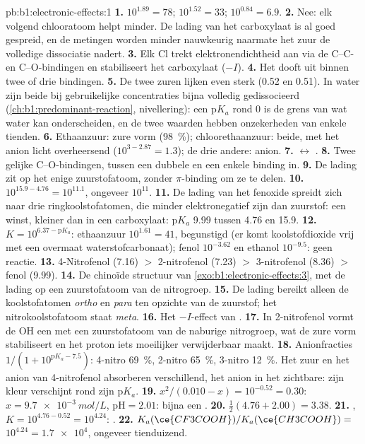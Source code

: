 \begin{solution}{pb:b1:electronic-effects:1}
\textbf{1.} $10^{1.89} = 78$; $10^{1.52} = 33$; $10^{0.84} = 6.9$.
\textbf{2.} Nee: elk volgend chlooratoom helpt minder. De lading van het
carboxylaat is al goed gespreid, en de metingen worden minder nauwkeurig
naarmate het zuur de volledige dissociatie nadert.
\textbf{3.} Elk Cl trekt elektronendichtheid aan via de C--C- en
C--O-bindingen en stabiliseert het carboxylaat ($-I$).
\textbf{4.} Het  dooft uit binnen twee of drie
bindingen.
\textbf{5.} De twee zuren lijken even sterk (0.52 en 0.51). In water zijn
beide bij gebruikelijke concentraties bijna volledig gedissocieerd
(\cref{ch:b1:predominant-reaction}, nivellering): een $\mathrm{p}K_a$ rond
0 is de grens van wat water kan onderscheiden, en de twee waarden hebben
onzekerheden van enkele tienden.
\textbf{6.} Ethaanzuur: zure vorm (\qty{98}{\percent}); chloorethaanzuur:
beide, met het anion licht overheersend ($10^{3 - 2.87} = 1.3$); de drie
andere: anion.
\textbf{7.}  $\leftrightarrow$ .
\textbf{8.} Twee gelijke C--O-bindingen, tussen een dubbele en een enkele
binding in.
\textbf{9.} De lading zit op het enige zuurstofatoom, zonder
$\pi$-binding om ze te delen.
\textbf{10.} $10^{15.9 - 4.76} = 10^{11.1}$, ongeveer $10^{11}$.
\textbf{11.} De lading van het fenoxide spreidt zich naar drie
ringkoolstofatomen, die minder elektronegatief zijn dan zuurstof: een
winst, kleiner dan in een carboxylaat: $\mathrm{p}K_a$ 9.99 tussen 4.76
en 15.9.
\textbf{12.} $K = 10^{6.37 - \mathrm{p}K_a}$: ethaanzuur $10^{1.61} = 41$,
begunstigd (er komt koolstofdioxide vrij met een overmaat
waterstofcarbonaat); fenol $10^{-3.62}$ en ethanol $10^{-9.5}$: geen
reactie.
\textbf{13.} 4-Nitrofenol (7.16) $>$ 2-nitrofenol (7.23) $>$ 3-nitrofenol
(8.36) $>$ fenol (9.99).
\textbf{14.} De chinoïde structuur van \cref{exo:b1:electronic-effects:3},
met de lading op een zuurstofatoom van de nitrogroep.
\textbf{15.} De lading bereikt alleen de koolstofatomen \textit{ortho} en
\textit{para} ten opzichte van de zuurstof; het nitrokoolstofatoom staat
\textit{meta}.
\textbf{16.} Het $-I$-effect van .
\textbf{17.} In 2-nitrofenol vormt de OH een  met een
zuurstofatoom van de naburige nitrogroep, wat de zure vorm stabiliseert
en het proton iets moeilijker verwijderbaar maakt.
\textbf{18.} Anionfracties $1/(1 + 10^{\mathrm{p}K_a - 7.5})$: 4-nitro
\qty{69}{\percent}, 2-nitro \qty{65}{\percent}, 3-nitro
\qty{12}{\percent}. Het zuur en het anion van 4-nitrofenol absorberen
verschillend, het anion in het zichtbare: zijn kleur verschijnt rond zijn
$\mathrm{p}K_a$.
\textbf{19.} $x^2/(0.010 - x) = 10^{-0.52} = 0.30$: $x = \qty{9.7e-3}{mol/L}$,
$\mathrm{pH} = 2.01$: bijna een .
\textbf{20.} $\frac12(4.76 + 2.00) = 3.38$.
\textbf{21.} , $K = 10^{4.76 -
0.52} = 10^{4.24}$: .
\textbf{22.} $K_a(\ce{CF3COOH})/K_a(\ce{CH3COOH}) =$ \textbf{$10^{4.24} =
\num{1.7e4}$}, ongeveer tienduizend.
\end{solution}
